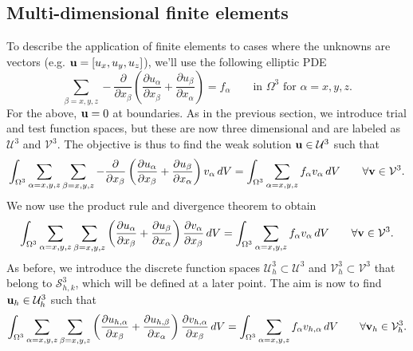 \documentclass[oneside,a4paper,11pt]{report}
\begin{document}
\subsection{Multi-dimensional finite elements}
To describe the application of finite elements to cases where the unknowns are vectors (e.g. $\mathbf{u} = [u_x,u_y,u_z]$), we'll use the following elliptic PDE
\begin{equation}
    \label{eq:fe_elliptic_pde_vector}
    \sum_{\beta=x,y,z} -\frac{\partial}{\partial x_\beta} \left ( \frac{\partial u_\alpha}{\partial x_\beta} + \frac{\partial u_\beta}{\partial x_\alpha} \right ) = f_\alpha \qquad \text{in } \Omega^3 \text{ for } \alpha = x,y,z.
\end{equation}
For the above, $\mathbf{u} = 0$ at boundaries. As in the previous section, we introduce trial and test function spaces, but these are now three dimensional and are labeled as $\mathcal{U}^3$ and $\mathcal{V}^3$. The objective is thus to find the weak solution $\mathbf{u} \in \mathcal{U}^3$ such that
\begin{equation}
    \int_{\Omega^3} \sum_{\alpha=x,y,z} \sum_{\beta=x,y,z} -\frac{\partial}{\partial x_\beta} \left ( \frac{\partial u_\alpha}{\partial x_\beta} + \frac{\partial u_\beta}{\partial x_\alpha} \right ) v_\alpha \, dV = \int_{\Omega^3} \sum_{\alpha=x,y,z} f_\alpha v_\alpha \,dV \qquad \forall \mathbf{v} \in \mathcal{V}^3.
\end{equation}
We now use the product rule and divergence theorem to obtain
\begin{equation}
    \int_{\Omega^3} \sum_{\alpha=x,y,z} \sum_{\beta=x,y,z} \left ( \frac{\partial u_\alpha}{\partial x_\beta} + \frac{\partial u_\beta}{\partial x_\alpha} \right ) \frac{\partial v_\alpha}{\partial x_\beta} \, dV = \int_{\Omega^3} \sum_{\alpha=x,y,z} f_\alpha v_\alpha \,dV \qquad \forall \mathbf{v} \in \mathcal{V}^3.
\end{equation}
As before, we introduce the discrete function spaces $\mathcal{U}_h^3 \subset \mathcal{U}^3$ and $\mathcal{V}^3_h \subset \mathcal{V}^3$ that belong to $\mathcal{S}_{h,k}^3$, which will be defined at a later point. The aim is now to find $\mathbf{u}_h \in \mathcal{U}_h^3$ such that
\begin{equation}
    \int_{\Omega^3} \sum_{\alpha=x,y,z} \sum_{\beta=x,y,z} \left ( \frac{\partial u_{h,\alpha}}{\partial x_\beta} + \frac{\partial u_{h,\beta}}{\partial x_\alpha} \right ) \frac{\partial v_{h,\alpha}}{\partial x_\beta} \, dV = \int_{\Omega^3} \sum_{\alpha=x,y,z} f_\alpha v_{h,\alpha} \,dV \qquad \forall \mathbf{v}_h \in \mathcal{V}_h^3.
\end{equation}
\end{document}
